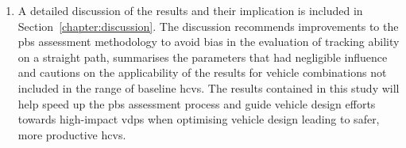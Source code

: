 \begin{enumerate}
\begin{enumerate}
\item Additional \gls{cv} matrices were developed comparing the inertial, geometrical, suspension and tyre \glspl{vdp} in isolation (see Appendices~\ref{section:cv-geometrical}~to~\ref{section:cv-tyre}). These \gls{cv} matrices highlight the \glspl{vdp} with the most influence within each category independent of all other \glspl{vdp} and will guide efforts focussed on a specific area of vehicle design.
\end{enumerate}
 
\item A detailed discussion of the results and their implication is included in Section~\ref{chapter:discussion}. The discussion recommends improvements to the \gls{pbs} assessment methodology to avoid bias in the evaluation of tracking ability on a straight path, summarises the parameters that had negligible influence and cautions on the applicability of the results for vehicle combinations not included in the range of baseline \glspl{hcv}. The results contained in this study will help speed up the \gls{pbs} assessment process and guide vehicle design efforts towards high-impact \glspl{vdp} when optimising vehicle design leading to safer, more productive \glspl{hcv}.

\end{enumerate}